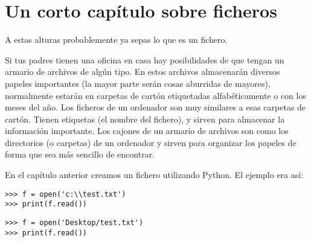 

\chapter{Un corto capítulo sobre ficheros}\label{ch:ashortchapteraboutfiles}

A estas alturas probablemente ya sepas lo que es un fichero.
\par
\noindent
Si tus padres tienen una oficina en casa hay posibilidades de que tengan un armario de archivos de algún tipo.  En estos archivos almacenarán diversos papeles importantes (la mayor parte serán cosas aburridas de mayores), normalmente estarán en carpetas de cartón etiquetadas alfabéticamente o con los meses del año.  Los ficheros de un ordenador son muy similares a esas carpetas de cartón.  Tienen etiquetas (el nombre del fichero), y sirven para almacenar la información importante. Los cajones de un armario de archivos son como los directorios (o carpetas) de un ordenador y sirven para organizar los papeles de forma que sea más sencillo de encontrar.
\par
En el capítulo anterior creamos un fichero utilizando Python. El ejemplo era así:

\begin{WINDOWS}

\begin{listing}
\begin{verbatim}
>>> f = open('c:\\test.txt')
>>> print(f.read())
\end{verbatim}
\end{listing}

\end{WINDOWS}

\begin{MAC}

\begin{listing}
\begin{verbatim}
>>> f = open('Desktop/test.txt')
>>> print(f.read())
\end{verbatim}
\end{listing}

\end{MAC}


